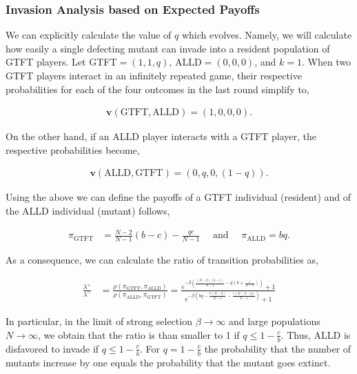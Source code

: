 \documentclass[11pt]{article}
\theoremstyle{plainCl1}
\theoremstyle{plainCl2}
\begin{document}
\subsubsection*{Invasion Analysis based on Expected Payoffs}

We can explicitly calculate the value of \(q\) which evolves. Namely, we will
calculate how easily a single defecting mutant can invade into a resident
population of GTFT players. Let GTFT\(= (1, 1, q)\), ALLD\(= (0, 0, 0)\), and
\(k = 1\). When two GTFT players interact in an infinitely repeated game, their
respective probabilities for each of the four outcomes in the last round
simplify to,

\begin{align*}
    \mathbf{v}(\text{GTFT}, \text{ALLD}) = (1, 0, 0, 0).
\end{align*}

On the other hand, if an ALLD player interacts with a GTFT player, the
respective probabilities become,

\begin{align*}
  \mathbf{v}(\text{ALLD}, \text{GTFT}) = (0, q, 0, (1 - q)).
\end{align*}

Using the above we can define the payoffs of a GTFT individual (resident)
and of the ALLD individual (mutant) follows,

\begin{align*}
  \displaystyle \pi_{\text{GTFT}} & = \displaystyle \frac{N\!-\!2}{N-1} (b - c)  -	\displaystyle\frac{q c}{N-1} \quad \text{ and } \quad \displaystyle \pi_{\text{ALLD}}  = \displaystyle b q.
\end{align*}

As a consequence, we can calculate the ratio of transition probabilities as,

\begin{align*}
    \frac{\lambda^{+}}{\lambda^{-}} & = \frac{\rho(\pi_{\text{GTFT}}, \pi_{\text{ALLD}})}{\rho(\pi_{\text{ALLD}}, \pi_{\text{GTFT}})}  = \frac{e^{-\beta \left(\frac{(N-2) (b-c)}{N-1} - q (b + \frac{c}{N-1})\right)}+1}
    {e^{-\beta\left(b q - \frac{b (N - 2)}{N-1} - \frac{c (N - 2 - q)}{N-1}\right)}+1}
\end{align*}

In particular, in the limit of strong selection \(\beta \rightarrow \infty\)
and large populations \(N \rightarrow \infty\), we obtain that the ratio is than
smaller to 1 if \(q \leq 1 - \frac{c}{b}\). Thus, ALLD is disfavored to invade
if \(q \leq 1 - \frac{c}{b}\). For \(q = 1 -\frac{c}{b}\) the probability that
the number of mutants increase by one equals the probability that the mutant
goes extinct.
\end{document}
